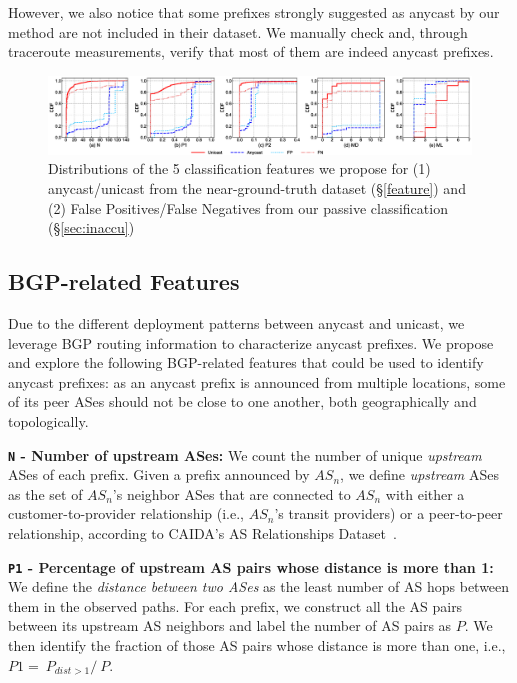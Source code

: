 However, we also notice that some prefixes strongly suggested as anycast by our method are not included in their dataset. We manually check and, through traceroute measurements, verify that most of them are indeed anycast prefixes. 

\begin{figure}[th]
	\centerline{\includegraphics[scale=0.312]{fig/features.eps}}
	\vspace{3pt}
	\caption{ Distributions of the 5 classification features we propose for (1) anycast/unicast from the near-ground-truth dataset (\S\ref{feature}) and (2) False Positives/False Negatives from our passive classification (\S\ref{sec:inaccu})}
	\label{fig_FP_FN}
\end{figure}

\subsection{BGP-related Features}

Due to the different deployment patterns between anycast and unicast, we leverage BGP routing information to characterize anycast prefixes. We propose and explore the following BGP-related features that could be used to identify anycast prefixes: as an anycast prefix is announced from multiple locations, some of its peer ASes should not be close to one another, both geographically and topologically.

\vspace{2pt}
\textbf{\texttt{N} - Number of upstream ASes:} We count the number of unique
\textit{upstream} ASes of each prefix. Given a prefix announced by $AS_{n}$, we
define \textit{upstream} ASes as the set of $AS_{n}$'s neighbor ASes that are
connected to $AS_{n}$ with either a customer-to-provider relationship (i.e.,
$AS_{n}$'s transit providers) or a peer-to-peer relationship, according to CAIDA's AS Relationships Dataset~\cite{as-rel}.

\textbf{\texttt{P1} - Percentage of upstream AS pairs whose distance is more than 1:}  We define the \textit{distance between two ASes} as the least number of AS hops between them in the observed paths.
For each prefix, we construct all the AS pairs between its upstream AS neighbors and label the number of AS pairs as $P$. We then identify the fraction of those AS pairs whose distance   is more than one, i.e., $P1=\ P_{dist>1}/ \ P$. 

